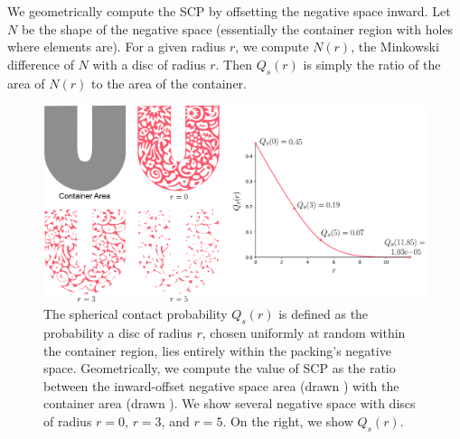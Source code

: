 We geometrically compute the SCP by offsetting the negative
space inward.  Let $N$ be the shape of the negative space (essentially
the container region with holes where elements are).  For a given radius
$r$, we compute $N(r)$, the Minkowski difference of $N$ with a disc of
radius $r$.  Then $Q_s(r)$ is simply the ratio of the area of $N(r)$ to
the area of the container.

\begin{figure}[t]
\centering
\includegraphics[width=1.0\textwidth]{figures/metrics/unilever_scp.pdf}
\caption[An illustration of calculating $Q_s(r)$]
{\label{fig_unilever_scp}
\newtext
{
    The spherical contact probability $Q_s(r)$ is defined as the probability 
    a disc of radius $r$, chosen uniformly at random within the container region, lies entirely within the 
	packing's negative space.
	Geometrically, we compute the value of  SCP as the ratio between the inward-offset negative space area (drawn )
	with the container area (drawn ).
	We show several  negative space with discs of radius $r = 0$, $r = 3$, and $r = 5$.
	On the right, we show  $Q_s(r)$.
}
}
\end{figure}

